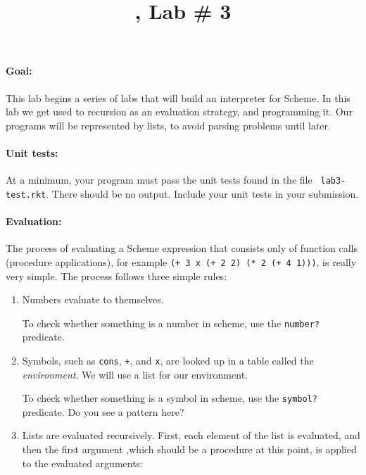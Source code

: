 \documentclass[letterpaper,12pt]{article}
\title{\course, Lab \# 3}
\author{\term}
\date{}
\begin{document}
\maketitle
\setlength{\columnsep}{2em}

\begin{multicols}{2}

\paragraph{Goal:} This lab begins a series of labs that will
build an interpreter for Scheme.  In this lab we get used to
recursion as an evaluation strategy, and programming it.
Our programs will be represented by lists, to avoid parsing problems
until later.

\paragraph{Unit tests:}
At a minimum, your program must pass the unit tests found in the file {\tt
  lab3-test.rkt}.  There should be no output.  Include your unit tests in your
submission.

\paragraph{Evaluation:}  
The process of evaluating a Scheme expression that consists only of
function calls (procedure applications), for example
{\tt (+  3 x (+ 2 2) (* 2 (+ 4 1)))}, is really very simple.
The process follows three simple rules:
\begin{enumerate}\setlength{\itemsep}{0pt}

\item Numbers evaluate to themselves.

  To check whether something
  is a number in scheme, use the {\tt number?} predicate.

\item Symbols, such as {\tt cons}, {\tt +}, and {\tt x},
  are looked up in a table
  called the {\em environment}.  We will use a list for our
  environment.

  To check whether something is a symbol in scheme, use the
  {\tt symbol?} predicate.  Do you see a pattern here?

\item Lists are evaluated recursively.  First, each element of the list is
  evaluated, and then the first argument ,which should be a procedure at this
  point, is applied to the evaluated arguments:
  

\end{enumerate}
\end{multicols}
\end{document}
